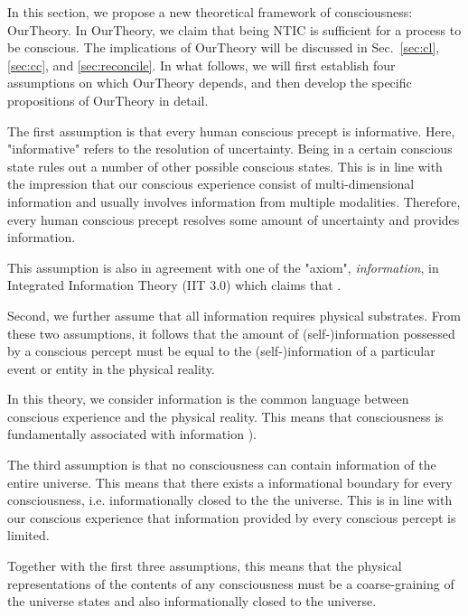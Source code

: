 \documentclass[utf8]{article}
\begin{document}
        In this section, we propose a new theoretical framework of consciousness: \acf{OurTheory}.  In \ac{OurTheory}, we claim that being NTIC is sufficient for a process to be conscious. The implications of \ac{OurTheory} will be discussed in Sec.~\ref{sec:cl}, \ref{sec:cc}, and \ref{sec:reconcile}. In what follows, we will first establish four assumptions on which \ac{OurTheory} depends, and then develop the specific propositions of \ac{OurTheory} in detail. 
        
        The first assumption is that every human conscious precept is informative. Here, "informative" refers to the resolution of uncertainty. Being in a certain conscious state rules out a number of other possible conscious states. This is in line with the impression that our conscious experience consist of multi-dimensional information and usually involves information from multiple modalities. Therefore, every human conscious precept resolves some amount of uncertainty and provides information.  
        
        This assumption is also in agreement with one of the "axiom", \textit{information}, in Integrated Information Theory (IIT 3.0) which claims that  \citep[p.2]{oizumi2014phenomenology}.
        
        Second, we further assume that all information requires physical substrates. 
        From these two assumptions, it follows that the amount of (self-)information possessed by a conscious percept must be equal to the (self-)information of a particular event or entity in the physical reality. 
        
        In this theory, we consider information is the common language between conscious experience and the physical reality. This means that consciousness is fundamentally associated with information \citep{chalmers1996conscious, tononi2004information, gamez2011information, Gamez2016}).
        
        The third assumption is that no consciousness can contain information of the entire universe. This means that there exists a informational boundary for every consciousness, i.e. informationally closed to the the universe. This is in line with our conscious experience that information provided by every conscious percept is limited.
    
        Together with the first three assumptions, this means that the physical representations of the contents of any consciousness must be a coarse-graining of the universe states and also informationally closed to the universe.
        
\end{document}
